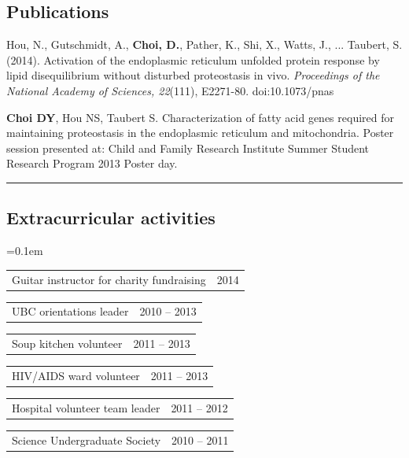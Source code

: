 \documentclass[10pt,letterpaper]{article}
\makeatletter
\newenvironment{indentsection}[1]%
{\begin{list}{}%
	{\setlength{\leftmargin}{#1}}%
	\item[]%
}
{\end{list}}
\newcommand{\headerrow}[2]
{\begin{tabular*}{\linewidth}{l@{\extracolsep{\fill}}r}
	#1 &
	#2 \\
\end{tabular*}}
\makeatother
\begin{document}
\subsection*{Publications}

\begin{indentsection}{\parindent}
\begin{description*}
	\item
	Hou, N., Gutschmidt, A., \textbf{Choi, D.}, Pather, K., Shi, X., Watts, J., ... Taubert, S. 
	(2014). Activation of the endoplasmic reticulum unfolded protein response by 
	lipid disequilibrium without disturbed proteostasis in vivo. \textit{Proceedings of the 
	National Academy of Sciences, 22}(111), E2271-80. doi:10.1073/pnas
	\item
	\textbf{Choi DY}, Hou NS, Taubert S. Characterization of fatty acid genes required for 
	maintaining proteostasis in the endoplasmic reticulum and mitochondria. Poster 
	session presented at: Child and Family Research Institute Summer Student Research 
	Program 2013 Poster day.
\end{description*}
\end{indentsection}
\hrule
\vspace{-0.4em}

\subsection*{Extracurricular activities}

\begin{itemize*}
	\parskip=0.1em
	\item 
	\headerrow
		{{Guitar instructor for charity fundraising}}
		{{2014}}
	\item 
	\headerrow
		{{UBC orientations leader}}
		{{2010 -- 2013}}
	\item 
	\headerrow
		{{Soup kitchen volunteer}}
		{{2011 -- 2013}}
	\item 
	\headerrow
		{{HIV/AIDS ward volunteer}}
		{{2011 -- 2013}}
	\item 
	\headerrow
		{{Hospital volunteer team leader}}
		{{2011 -- 2012}}
	\item 
	\headerrow
		{{Science Undergraduate Society}}
		{{2010 -- 2011}}
\end{itemize*}
\vspace{-0.4em}
\end{document}
